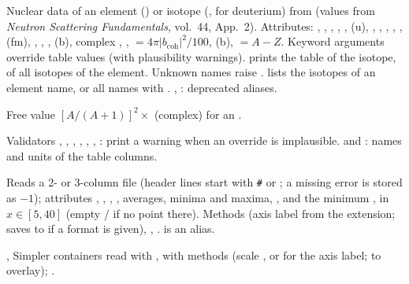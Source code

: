 \documentclass[11pt,a4paper]{article}
\begin{document}

 
Nuclear data of an element () or isotope (,
 for deuterium) from  (values from
\emph{Neutron Scattering Fundamentals}, vol.~44, App.~2). Attributes:
, , , , , 
(u), , , , ,
,  (fm), , ,
,  (b), complex , ,
 $=4\pi|b_\mathrm{coh}|^2/100$,  (b),
 $=A-Z$. Keyword arguments override table values (with
plausibility warnings).  prints the table of the isotope,
 of all isotopes of the element. Unknown names raise
.  lists the isotopes of an
element name, or all names with . ,
: deprecated aliases.

Free value $[A/(A+1)]^2\times$ (complex) for an .

\noindent Validators , , ,
, , , : print a warning when
an override is implausible.  and : names
and units of the table columns.


 
Reads a 2- or 3-column file (header lines start with \texttt{\#} or \code{!};
a missing error is stored as $-1$); attributes , ,
, , averages, minima and maxima, ,
 and the minimum ,  in
$x\in[5,40]$ (empty /  if no point there). Methods
 (axis label from the
extension; saves to  if a format is
given), , .  is an
alias.

, 
Simpler containers read with , with  methods
(scale ,  or  for the axis label;
 to overlay); . \legacy
\end{document}
